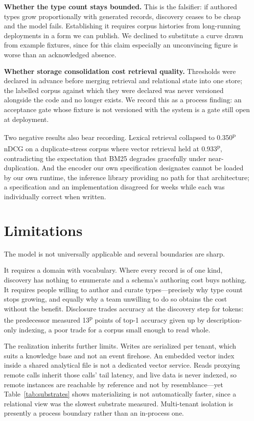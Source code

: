 \documentclass[journal,nofonttune]{IEEEtran}
\newcommand{\pn}[1]{#1\textsuperscript{\textsf{p}}}
\begin{document}
\textbf{Whether the type count stays bounded.} This is the falsifier: if
authored types grow proportionally with generated records, discovery ceases
to be cheap and the model fails. Establishing it requires corpus histories
from long-running deployments in a form we can publish. We declined to
substitute a curve drawn from example fixtures, since for this claim
especially an unconvincing figure is worse than an acknowledged absence.

\textbf{Whether storage consolidation cost retrieval quality.} Thresholds
were declared in advance before merging retrieval and relational state into
one store; the labelled corpus against which they were declared was never
versioned alongside the code and no longer exists. We record this as a
process finding: an acceptance gate whose fixture is not versioned with the
system is a gate still open at deployment.

Two negative results also bear recording. Lexical retrieval collapsed to
\pn{0.350} nDCG on a duplicate-stress corpus where vector retrieval held at
\pn{0.933}, contradicting the expectation that BM25 degrades gracefully under
near-duplication. And the encoder our own specification designates cannot be
loaded by our own runtime, the inference library providing no path for that
architecture; a specification and an implementation disagreed for weeks while
each was individually correct when written.

\section{Limitations}
\label{sec:limits}

The model is not universally applicable and several boundaries are sharp.

It requires a domain with vocabulary. Where every record is of one kind,
discovery has nothing to enumerate and a schema's authoring cost buys
nothing. It requires people willing to author and curate types---precisely
why type count stops growing, and equally why a team unwilling to do so
obtains the cost without the benefit. Disclosure trades accuracy at the
discovery step for tokens: the predecessor measured \pn{13} points of top-1
accuracy given up by description-only indexing, a poor trade for a corpus
small enough to read whole.

The realization inherits further limits. Writes are serialized per tenant,
which suits a knowledge base and not an event firehose. An embedded vector
index inside a shared analytical file is not a dedicated vector service.
Reads proxying remote calls inherit those calls' tail latency, and live data
is never indexed, so remote instances are reachable by reference and not by
resemblance---yet Table~\ref{tab:substrates} shows materializing is not
automatically faster, since a relational view was the slowest substrate
measured. Multi-tenant isolation is presently a process boundary rather than
an in-process one.
\end{document}
